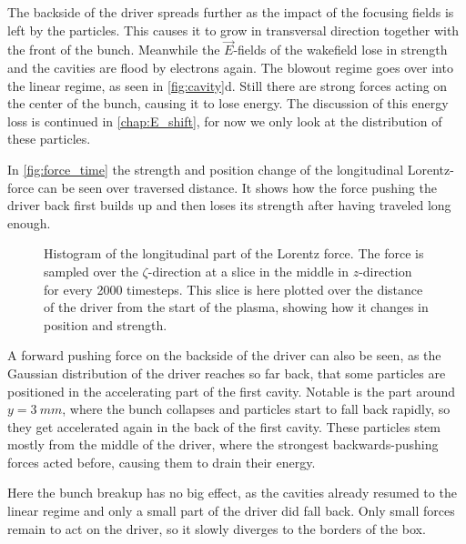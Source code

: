 \documentclass[bachelor_thesis]{subfiles}
\begin{document}
The backside of the driver spreads further as the impact of the focusing fields is left by the particles. This causes it to grow in transversal direction together with the front of the bunch. 
Meanwhile the $\vec{E}$-fields of the wakefield lose in strength and the cavities are flood by electrons again. The blowout regime goes over into the linear regime, as seen in \autoref{fig:cavity}d.
Still there are strong forces acting on the center of the bunch, causing it to lose energy. The discussion of this energy loss is continued in \autoref{chap:E_shift}, for now we only look at the distribution of these particles.

In \autoref{fig:force_time} the strength and position change of the longitudinal Lorentz-force can be seen over traversed distance. It shows how the force pushing the driver back first builds up and then loses its strength after having traveled long enough.
\begin{figure}
	\centering
	
	\caption{Histogram of the longitudinal part of the Lorentz force. The force is sampled over the $\zeta$-direction at a slice in the middle in $z$-direction for every 2000 timesteps. This slice is here plotted over the distance of the driver from the start of the plasma, showing how it changes in position and strength.}
	\label{fig:force_time}
\end{figure}
A forward pushing force on the backside of the driver can also be seen, as the Gaussian distribution of the driver reaches so far back, that some particles are positioned in the accelerating part of the first cavity.
Notable is the part around $y=\qty{3}{mm}$, where the bunch collapses and particles start to fall back rapidly, so they get accelerated again in the back of the first cavity. These particles stem mostly from the middle of the driver,
where the strongest backwards-pushing forces acted before, causing them to drain their energy. 

Here the bunch breakup has no big effect, as the cavities already resumed to the linear regime and only a small part of the driver did fall back. Only small forces remain to act on the driver, so it slowly diverges to the borders of the box.
\end{document}
